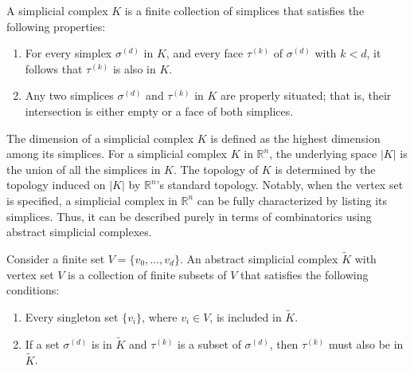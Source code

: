 \begin{definition}
	{\cite[Definition 2.2]{boissonnat2018geometric}} \label{simplicialcomplex}
	A simplicial complex $K$ is a finite collection of simplices that satisfies the
	following properties:
	\begin{enumerate}
		\item For every simplex $\sigma^{(d)}$ in $K$, and every face $\tau^{(k)}$
		      of $\sigma^{(d)}$ with $k < d$, it follows that $\tau^{(k)}$ is also in $K$.
		      		      		      		      		      
		\item Any two simplices $\sigma^{(d)}$ and $\tau^{(k)}$ in $K$ are properly situated;
		      that is, their intersection is either empty or a face of both simplices.
	\end{enumerate}
\end{definition}

The dimension of a simplicial complex $K$ is defined as the highest dimension among its simplices. For a simplicial complex $K$ in $\mathbb{R}^{n}$, the underlying space $\vert K \vert$ is the union of all the simplices in $K$. The topology of $K$ is determined by the topology induced on $\vert K \vert$ by $\mathbb{R}^{n}$'s
standard topology. Notably, when the vertex set is specified, a simplicial complex
in $\mathbb{R}^{n}$ can be fully characterized by listing its simplices. Thus, it
can be described purely in terms of combinatorics using abstract simplicial complexes.

\begin{definition}
	{\cite[Definition 2.3]{boissonnat2018geometric}} \label{abstractsimplicialcomplex}
	Consider a finite set $V = \{v_{0}, \ldots, v_{d}\}$. An abstract simplicial
	complex $\tilde{K}$ with vertex set $V$ is a
	collection of finite subsets of $V$ that satisfies the following conditions:
	\begin{enumerate}
		\item Every singleton set $\{v_{i}\}$, where $v_{i} \in V$, is included in $\tilde
		      {K}$.
		      		      		      		      		      
		\item If a set $\sigma^{(d)}$ is in $\tilde{K}$ and $\tau^{(k)}$ is a subset
		      of $\sigma^{(d)}$, then $\tau^{(k)}$ must also be in $\tilde{K}$.
	\end{enumerate}
\end{definition}

